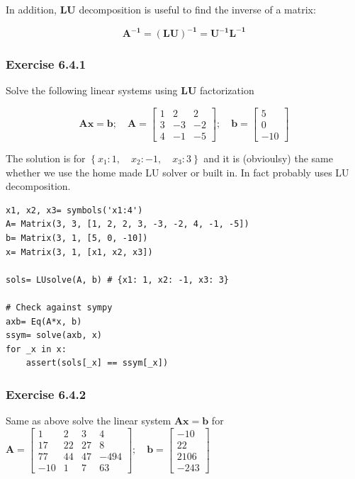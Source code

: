 In addition, \textbf{LU} decomposition is useful to find the inverse of a matrix:

$$
\mathbf{A^{-1} = (LU)^{-1} = U^{-1}L^{-1}}
$$

\subsubsection{Exercise 6.4.1}

Solve the following linear systems using \textbf{LU} factorization

$$
\mathbf{Ax = b}; \quad
\mathbf{A}= \left[\begin{matrix}1 & 2 & 2\\3 & -3 & -2\\4 & -1 & -5\end{matrix}\right]; \quad
\mathbf{b}= \left[\begin{matrix}5\\0\\-10\end{matrix}\right]
$$

The solution is for $\left \{ x_{1} : 1, \quad x_{2} : -1, \quad x_{3} : 3\right \}$
and it is (obvioulsy) the same whether we use the home made LU solver or
\sympy built in. In fact \sympy probably uses LU decomposition.

\begin{verbatim}
x1, x2, x3= symbols('x1:4')
A= Matrix(3, 3, [1, 2, 2, 3, -3, -2, 4, -1, -5])
b= Matrix(3, 1, [5, 0, -10])
x= Matrix(3, 1, [x1, x2, x3])

sols= LUsolve(A, b) # {x1: 1, x2: -1, x3: 3}

# Check against sympy
axb= Eq(A*x, b)
ssym= solve(axb, x)
for _x in x:
    assert(sols[_x] == ssym[_x])
\end{verbatim}

\subsubsection{Exercise 6.4.2}

Same as above solve the linear system $\mathbf{Ax = b}$ for
$\mathbf{A}= \left[\begin{matrix}1 & 2 & 3 & 4\\17 & 22 & 27 & 8\\77 & 44 & 47 & -494\\-10 & 1 & 7 & 63\end{matrix}\right]; \quad
\mathbf{b}= \left[\begin{matrix}-10\\22\\2106\\-243\end{matrix}\right]$

